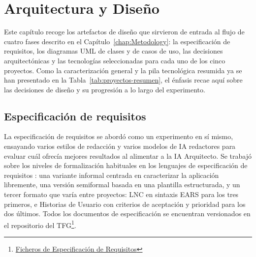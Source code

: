 
\chapter{Arquitectura y Diseño} \label{chap:Design}

Este capítulo recoge los artefactos de diseño que sirvieron de entrada al flujo de cuatro fases descrito en el Capítulo~\ref{chap:Metodology}: la especificación de requisitos, los diagramas UML \cite{Fowler:2004:UML} de clases y de casos de uso, las decisiones arquitectónicas y las tecnologías seleccionadas para cada uno de los cinco proyectos. Como la caracterización general y la pila tecnológica resumida ya se han presentado en la Tabla~\ref{tab:proyectos-resumen}, el énfasis recae aquí sobre las decisiones de diseño y su progresión a lo largo del experimento.

\section{Especificación de requisitos} \label{sec:requirements}

La especificación de requisitos se abordó como un experimento en sí mismo, ensayando varios estilos de redacción y varios modelos de \ac{IA} redactores para evaluar cuál ofrecía mejores resultados al alimentar a la \ac{IA} Arquitecto. Se trabajó sobre los niveles de formalización habituales en los lenguajes de especificación de requisitos \cite{Sommerville:2015:SE, Pohl:2010:RE, ISO:29148:2018}: una variante informal centrada en caracterizar la aplicación libremente, una versión semiformal basada en una plantilla estructurada, y un tercer formato que varía entre proyectos: \ac{LNC} en sintaxis \ac{EARS} \cite{Mavin:2009:EARS} para los tres primeros, e Historias de Usuario con criterios de aceptación y prioridad para los dos últimos. Todos los documentos de especificación se encuentran versionados en el repositorio del \ac{TFG}\footnote{\href{https://github.com/alu0101549491/TFG-Fabian-Gonzalez-Lence/tree/main/resources/requirement-specifications}{Ficheros de Especificación de Requisitos}}.\\

